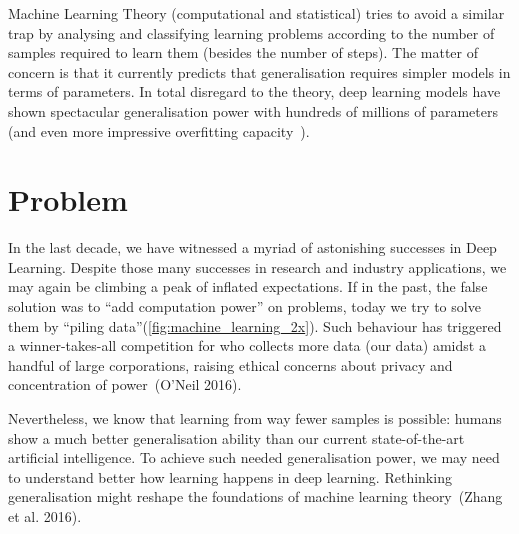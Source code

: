 \documentclass[
  a4paperpaper,
  a4paper,
  12pt,
  twoside,
  brazil,
  british,
  open=right]{scrbook}
\begin{document}
Machine Learning Theory (computational and statistical) tries to avoid a
similar trap by analysing and classifying learning problems according to
the number of samples required to learn them (besides the number of
steps). The matter of concern is that it currently predicts that
generalisation requires simpler models in terms of parameters. In total
disregard to the theory, deep learning models have shown spectacular
generalisation power with hundreds of millions of parameters (and even
more impressive overfitting capacity~).

\hypertarget{problem}{%
\section{Problem}\label{problem}}

In the last decade, we have witnessed a myriad of astonishing successes
in Deep Learning. Despite those many successes in research and industry
applications, we may again be climbing a peak of inflated expectations.
If in the past, the false solution was to ``add computation power'' on
problems, today we try to solve them by ``piling
data''(\protect\hyperlink{fig:machine_learning_2x}{{[}fig:machine\_learning\_2x{]}}).
Such behaviour has triggered a winner-takes-all competition for who
collects more data (our data) amidst a handful of large corporations,
raising ethical concerns about privacy and concentration of
power~(O'Neil
2016).

Nevertheless, we know that learning from way fewer samples is possible:
humans show a much better generalisation ability than our current
state-of-the-art artificial intelligence. To achieve such needed
generalisation power, we may need to understand better how learning
happens in deep learning. Rethinking generalisation might reshape the
foundations of machine learning theory~(Zhang et al.
2016).
\end{document}
